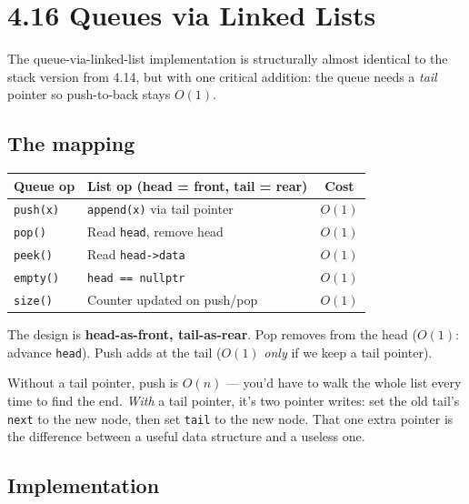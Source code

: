 \documentclass[11pt]{article}
\begin{document}
\section{4.16 Queues via Linked Lists}

The queue-via-linked-list implementation is structurally almost
identical to the stack version from 4.14, but with one critical
addition: the queue needs a \emph{tail} pointer so push-to-back
stays $O(1)$.

\subsection*{The mapping}

\begin{center}
\begin{tabular}{|l|l|c|}
\hline
\textbf{Queue op} & \textbf{List op (head = front, tail = rear)} & \textbf{Cost} \\
\hline
\texttt{push(x)}  & \texttt{append(x)} via tail pointer & $O(1)$ \\
\texttt{pop()}    & Read \texttt{head}, remove head    & $O(1)$ \\
\texttt{peek()}   & Read \texttt{head->data}           & $O(1)$ \\
\texttt{empty()}  & \texttt{head == nullptr}           & $O(1)$ \\
\texttt{size()}   & Counter updated on push/pop        & $O(1)$ \\
\hline
\end{tabular}
\end{center}

The design is \textbf{head-as-front, tail-as-rear}. Pop removes
from the head ($O(1)$: advance \texttt{head}). Push adds at the
tail ($O(1)$ \emph{only} if we keep a tail pointer).

\begin{ideabox}
Without a tail pointer, push is $O(n)$ --- you'd have to walk the
whole list every time to find the end. \emph{With} a tail
pointer, it's two pointer writes: set the old tail's
\texttt{next} to the new node, then set \texttt{tail} to the new
node. That one extra pointer is the difference between a useful
data structure and a useless one.
\end{ideabox}

\subsection*{Implementation}
\end{document}
